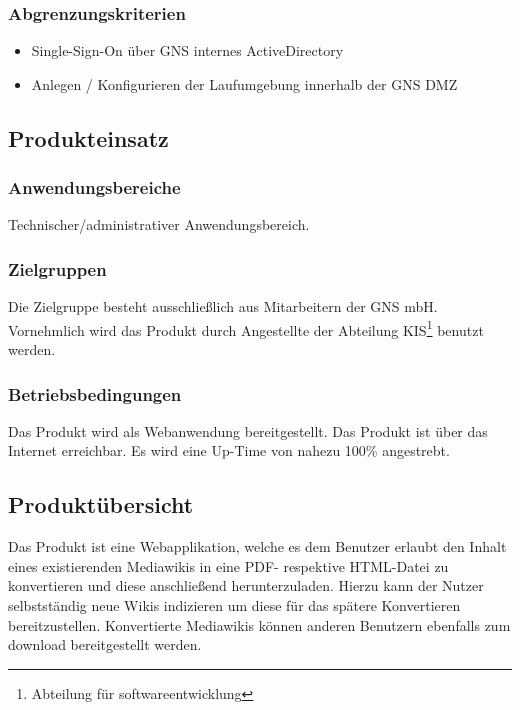 	\subsubsection{Abgrenzungskriterien}
		\begin{itemize}
			\item Single-Sign-On über GNS internes ActiveDirectory
			\item Anlegen / Konfigurieren der Laufumgebung innerhalb der GNS DMZ
		\end{itemize}

\subsection{Produkteinsatz}

	\subsubsection{Anwendungsbereiche}
		Technischer/administrativer Anwendungsbereich.

	\subsubsection{Zielgruppen}
		Die Zielgruppe besteht ausschließlich aus Mitarbeitern der GNS mbH.
		Vornehmlich wird das Produkt durch Angestellte der Abteilung
		KIS\footnote{Abteilung für softwareentwicklung} benutzt werden.

	\subsubsection{Betriebsbedingungen}
		Das Produkt wird als Webanwendung bereitgestellt. Das Produkt ist über das Internet erreichbar.
		Es wird eine Up-Time von nahezu 100\% angestrebt.


\subsection{Produktübersicht}
	Das Produkt ist eine Webapplikation, welche es dem Benutzer erlaubt den Inhalt eines existierenden
	Mediawikis in eine PDF- respektive HTML-Datei zu konvertieren und diese anschließend herunterzuladen.
	Hierzu kann der Nutzer selbstständig neue Wikis indizieren um diese für das spätere Konvertieren
	bereitzustellen. Konvertierte Mediawikis können anderen Benutzern ebenfalls zum download bereitgestellt
	werden.

